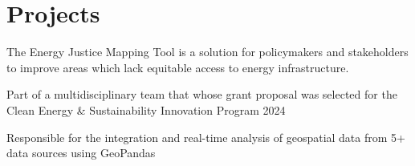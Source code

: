 \documentclass[]{resume-template}
\begin{document}
\begin{minipage}[t]{0.66\textwidth}
    \section{Projects}\label{sec:projects}
    \label{subsec:exo-eda}
    \begin{tightemize}
        \item The Energy Justice Mapping Tool is a solution for policymakers and stakeholders to improve areas which lack equitable access to energy infrastructure.
        \item Part of a multidisciplinary team that whose grant proposal was selected for the Clean Energy \& Sustainability Innovation Program 2024
        \item Responsible for the integration and real-time analysis of geospatial data from 5+ data sources using GeoPandas
    \end{tightemize}

\end{minipage}
\end{document}
